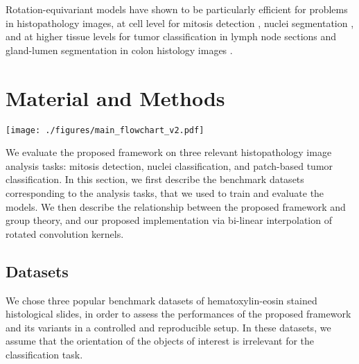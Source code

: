 \documentclass[twocolumn,final]{article}
\newcommand{\se}[1]{\textit{SE(#1)}}
\newcommand{\mset}[2]{}
\begin{document}
Rotation-equivariant models have shown to be particularly efficient for problems in histopathology images, at cell level for mitosis detection \citep{bekkers2018roto}, nuclei segmentation \citep{chidester2019nuclear}, and at higher tissue levels for tumor classification in lymph node sections \citep{veeling2018rotation} and gland-lumen segmentation in colon histology images \citep{graham2019rota}.


\section{Material and Methods}

\begin{figure*}[ht!]
\begin{center}
\texttt{[image: ./figures/main\_flowchart\_v2.pdf]}
\end{center}
\caption{
\footnotesize
Illustration of the three types of layers investigated in our G-CNNs.
The \textit{lifting layer} uses a set of rotated kernels in \mset{R}{2} to output an activation map that is an image on \se{2}.
The \textit{\se{2} group convolution layer} applies a \textit{shift-twist convolution} via a set of rotated-and-shifted kernels in \se{2} to output a \se{2}-image activation map (red border highlights the kernel transformation, cyan border highlights the output of a \se{2} kernel).
The \textit{projection layer} transforms an input \se{2}-image onto \mset{R}{2} via a rotation-invariant operation (pixel-wise maximum projection is used here).
A 3-channel input is shown for the \se{2} group convolution layer and 1-channel outputs are shown for all the layers: this is done for illustrative purposes but more channels are used in practice.
The example images used for the examples are extracted from a trained nuclei segmentation model with a 8-fold discretization of \se{2}.
}
\label{fig:mainFlowchart}
\end{figure*}

We evaluate the proposed framework on three relevant histopathology image analysis tasks: mitosis detection, nuclei classification, and patch-based tumor classification.
In this section, we first describe the benchmark datasets corresponding to the analysis tasks, that we used to train and evaluate the models.
We then describe the relationship between the proposed framework and group theory, and our proposed implementation via bi-linear interpolation of rotated convolution kernels.


\subsection{Datasets}
\label{datasets}
We chose three popular benchmark datasets of hematoxylin-eosin stained histological slides, in order to assess the performances of the proposed framework and its variants in a controlled and reproducible setup.
In these datasets, we assume that the orientation of the objects of interest is irrelevant for the classification task.
\end{document}

